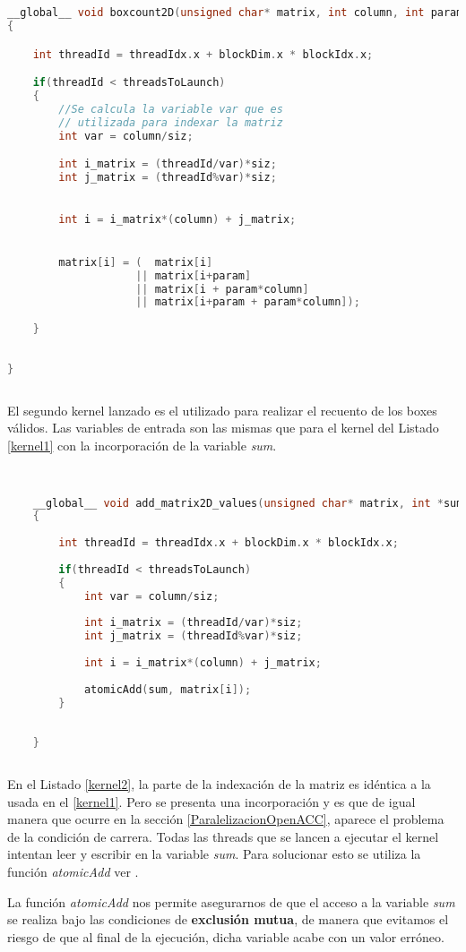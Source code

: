 \newpage
\begin{lstlisting}[language=C++,caption={Kernel boxcount2D},label=kernel1]


__global__ void boxcount2D(unsigned char* matrix, int column, int param, int siz, int threadsToLaunch)
{

    int threadId = threadIdx.x + blockDim.x * blockIdx.x;

    if(threadId < threadsToLaunch)
    {
        //Se calcula la variable var que es 
        // utilizada para indexar la matriz
        int var = column/siz;

        int i_matrix = (threadId/var)*siz;
        int j_matrix = (threadId%var)*siz;

    
        int i = i_matrix*(column) + j_matrix;


        matrix[i] = (  matrix[i] 
                    || matrix[i+param] 
                    || matrix[i + param*column] 
                    || matrix[i+param + param*column]);
        
    }
 
    
}
    
\end{lstlisting}

El segundo kernel lanzado es el utilizado para realizar el recuento de los boxes válidos. Las variables de entrada son las mismas que para el kernel del Listado \ref{kernel1} con la incorporación de la variable \textit{sum}.
\newpage
\begin{lstlisting}[language=C++,caption={Kernel para la acumulación de boxes válidos},label=kernel2]


    __global__ void add_matrix2D_values(unsigned char* matrix, int *sum, int column, int siz, int threadsToLaunch)
    {
    
        int threadId = threadIdx.x + blockDim.x * blockIdx.x;
    
        if(threadId < threadsToLaunch)
        {
            int var = column/siz;
    
            int i_matrix = (threadId/var)*siz;
            int j_matrix = (threadId%var)*siz;
    
            int i = i_matrix*(column) + j_matrix;
        
            atomicAdd(sum, matrix[i]);
        }
            
    
    }
        
\end{lstlisting}

En el Listado \ref{kernel2}, la parte de la indexación de la matriz es idéntica a la usada en el \ref{kernel1}. Pero se presenta una incorporación y es que de igual manera que ocurre en la sección \ref{ParalelizacionOpenACC}, aparece el problema de la condición de carrera. Todas las threads que se lancen a ejecutar el kernel intentan leer y escribir en la variable \textit{sum}. Para solucionar esto se utiliza la función \textit{atomicAdd} ver \cite{unknown-author-2021H}.

La función \textit{atomicAdd} nos permite asegurarnos de que el acceso a la variable \textit{sum} se realiza bajo las condiciones de \textbf{exclusión mutua}, de manera que evitamos el riesgo de que al final de la ejecución, dicha variable acabe con un valor erróneo.